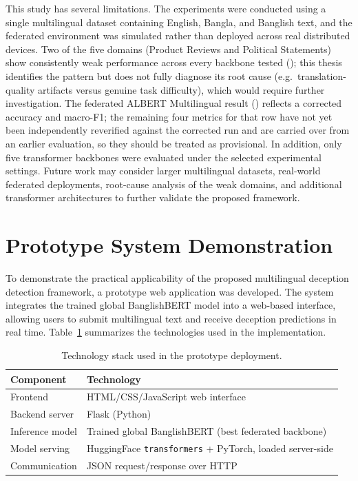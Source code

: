 This study has several limitations. The experiments were conducted using a
single multilingual dataset containing English, Bangla, and Banglish text, and
the federated environment was simulated rather than deployed across real
distributed devices. Two of the five domains (Product Reviews and Political
Statements) show consistently weak performance across every backbone tested
(); this thesis identifies the pattern but does not
fully diagnose its root cause (e.g.\ translation-quality artifacts versus
genuine task difficulty), which would require further investigation. The
federated ALBERT Multilingual result () reflects a
corrected accuracy and macro-F1; the remaining four metrics for that row have
not yet been independently reverified against the corrected run and are
carried over from an earlier evaluation, so they should be treated as
provisional. In addition, only five transformer backbones were evaluated under
the selected experimental settings. Future work may consider larger
multilingual datasets, real-world federated deployments, root-cause analysis
of the weak domains, and additional transformer architectures to further
validate the proposed framework.

\section{Prototype System Demonstration}
\label{sec:prototype}

To demonstrate the practical applicability of the proposed multilingual deception
detection framework, a prototype web application was developed. The system
integrates the trained global BanglishBERT model into a web-based interface,
allowing users to submit multilingual text and receive deception predictions in
real time. Table~\ref{tab:deployment_stack} summarizes the technologies used in
the implementation.

\begin{table}[htbp]
\centering
\caption{Technology stack used in the prototype deployment.}
\label{tab:deployment_stack}
\begin{tabular}{@{}ll@{}}
\toprule
\textbf{Component} & \textbf{Technology} \\
\midrule
Frontend            & HTML/CSS/JavaScript web interface \\
Backend server       & Flask (Python) \\
Inference model      & Trained global BanglishBERT (best federated backbone) \\
Model serving         & HuggingFace \texttt{transformers} + PyTorch, loaded server-side \\
Communication         & JSON request/response over HTTP \\
\bottomrule
\end{tabular}
\end{table}

